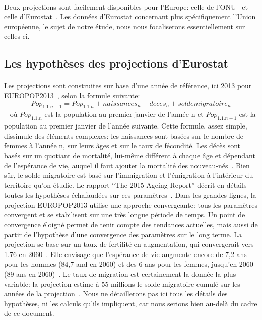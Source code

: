 \paragraph{}Deux projections sont facilement disponibles pour l’Europe: celle de l’ONU~\citep{onu} et celle d’Eurostat~\citep{eurostat_europop13}. Les données d’Eurostat concernant plus spécifiquement l’Union européenne, le sujet de notre étude, nous nous focaliserons essentiellement sur celles-ci.  

\subsection{Les hypothèses des projections d’Eurostat}
\paragraph{}Les projections sont construites sur base d’une année de référence, ici 2013 pour EUROPOP2013~\citep{eurostat_europop13}, selon la formule suivante:
$$ Pop_{1.1.n+1} = Pop_{1.1.n} + naissances_{n} - deces_{n} + solde migratoire_{n} $$ ~\citep[pp.3]{INSEE}
où $Pop_{1.1.n}$ est la population au premier janvier de l'année n et $Pop_{1.1.n+1}$ est la population au premier janvier de l'année suivante. Cette formule, assez simple, dissimule des éléments complexes: les naissances sont basées sur le nombre de femmes à l’année n, sur leurs âges et sur le taux de fécondité. Les décès sont basés sur un quotiant de mortalité, lui-même différent à chaque âge et dépendant de l’espérance de vie, auquel il faut ajouter la mortalité des nouveau-nés~\citep[pp.4]{INSEE}. Bien sûr, le solde migratoire est basé sur l’immigration et l’émigration à l’intérieur du territoire qu’on étudie. Le rapport “The 2015 Ageing Report” décrit en détails toutes les hypothèses échafaudées sur ces paramètres~\citep[pp.8-14]{ageing_methodo}. Dans les grandes lignes, la projection EUROPOP2013 utilise une approche convergeante: tous les paramètres convergent et se stabilisent sur une très longue période de temps. Un point de convergence éloigné permet de tenir compte des tendances actuelles, mais aussi de partir de l’hypothèse d’une convergence des paramètres sur le long terme. La projection se base sur un taux de fertilité en augmentation, qui convergerait vers 1.76 en 2060~\citep[pp.9]{ageing_methodo}. Elle envisage que l’espérance de vie augmente encore de 7,2 ans pour les hommes (84,7 and en 2060) et des 6 ans pour les femmes, jusqu’en 2060 (89 ans en 2060)~\citep[pp.11]{ageing_methodo}. Le taux de migration est certainement la donnée la plus variable: la projection estime à 55 millions le solde migratoire cumulé sur les années de la projection~\citep[pp.14]{ageing_methodo}. Nous ne détaillerons pas ici tous les détails des hypothèses, ni les calculs qu’ils impliquent, car nous serions bien au-delà du cadre de ce document. 

